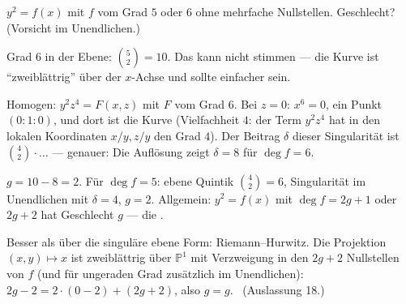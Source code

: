 \begin{aufgabe}
$y^{2} = f(x)$ mit $f$ vom Grad $5$ oder $6$ ohne mehrfache Nullstellen. Geschlecht? (Vorsicht im Unendlichen.)

\loesung
{}
Grad $6$ in der Ebene: $\binom52 = 10$. Das kann nicht stimmen --- die Kurve ist \enquote{zweiblättrig} über der $x$-Achse und sollte einfacher sein.

Homogen: $y^{2}z^{4} = F(x, z)$ mit $F$ vom Grad $6$. Bei $z = 0$: $x^{6} = 0$, ein Punkt $(0 : 1 : 0)$, und dort ist die Kurve  (Vielfachheit $4$: der Term $y^{2}z^{4}$ hat in den lokalen Koordinaten $x/y, z/y$ den Grad $4$). Der Beitrag $\delta$ dieser Singularität ist $\binom{4}{2}\cdot\ldots$ --- genauer: Die Auflösung zeigt $\delta = 8$ für $\deg f = 6$.

$g = 10 - 8 = 2$. Für $\deg f = 5$: ebene Quintik $\binom42 = 6$, Singularität im Unendlichen mit $\delta = 4$, $g = 2$. Allgemein: $y^{2} = f(x)$ mit $\deg f = 2g + 1$ oder $2g + 2$ hat Geschlecht $g$ --- die .

Besser als über die singuläre ebene Form: Riemann--Hurwitz. Die Projektion $(x, y)\mapsto x$ ist zweiblättrig über $\mathbb P^{1}$ mit Verzweigung in den $2g + 2$ Nullstellen von $f$ (und für ungeraden Grad zusätzlich im Unendlichen): $2g - 2 = 2\cdot(0 - 2) + (2g + 2)$, also $g = g$. \checkmark\ (Auslassung 18.)

\begin{center}
\begin{minipage}{0.88\textwidth}
\end{minipage}
\end{center}
\end{aufgabe}

